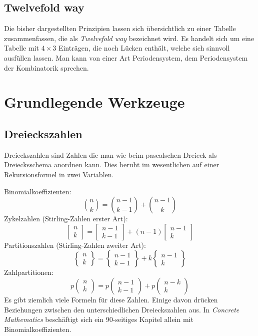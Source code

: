 \documentclass[a4paper,12pt,fleqn]{article}
\begin{document}
\subsection{Twelvefold way}
Die bisher dargestellten Prinzipien lassen sich übersichtlich
zu einer Tabelle zusammenfassen, die als \textit{Twelvefold way}
bezeichnet wird. Es handelt sich um eine Tabelle mit $4\times 3$
Einträgen, die noch Lücken enthält, welche sich sinnvoll ausfüllen
lassen. Man kann von einer Art Periodensystem, dem Periodensystem
der Kombinatorik sprechen.

\section{Grundlegende Werkzeuge}
\subsection{Dreieckszahlen}
Dreieckszahlen sind Zahlen die man wie beim pascalschen Dreieck
als Dreiecksschema anordnen kann. Dies beruht im wesentlichen
auf einer Rekursionsformel in zwei Variablen.

Binomialkoeffizienten:
\[\binom{n}{k} = \binom{n-1}{k-1}+\binom{n-1}{k}\]
Zykelzahlen (Stirling-Zahlen erster Art):
\[\begin{bmatrix}
n\\ k
\end{bmatrix} = \begin{bmatrix}
n-1\\ k-1
\end{bmatrix} + (n-1)\begin{bmatrix}
n-1\\ k
\end{bmatrix}\]
Partitionszahlen (Stirling-Zahlen zweiter Art):
\[\begin{Bmatrix}
n\\ k
\end{Bmatrix} = \begin{Bmatrix}
n-1\\ k-1
\end{Bmatrix} + k\begin{Bmatrix}
n-1\\ k
\end{Bmatrix}\]
Zahlpartitionen:
\[p\begin{pmatrix}
n\\ k
\end{pmatrix} = p\begin{pmatrix}
n-1\\ k-1
\end{pmatrix} + p\begin{pmatrix}
n-k\\ k
\end{pmatrix}\]
Es gibt ziemlich viele Formeln für diese Zahlen. Einige davon
drücken Beziehungen zwischen den unterschiedlichen Dreieckszahlen
aus. In \textit{Concrete Mathematics} beschäftigt sich ein
90-seitiges Kapitel allein mit Binomialkoeffizienten.
\end{document}
